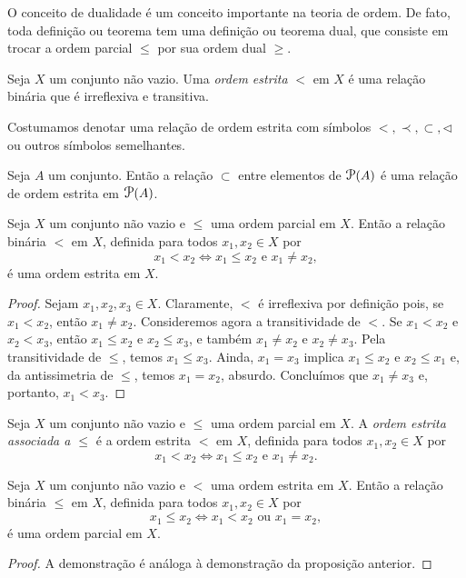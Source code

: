 	O conceito de dualidade é um conceito importante na teoria de ordem. De fato, toda definição ou teorema tem uma definição ou teorema dual, que consiste em trocar a ordem parcial $\leq$ por sua ordem dual $\geq$.

\begin{defi}
	Seja $X$ um conjunto não vazio. Uma \emph{ordem estrita} $<$ em $X$ é uma relação binária que é irreflexiva e transitiva.
\end{defi}

	Costumamos denotar uma relação de ordem estrita com símbolos $<, \prec, \subset, \lhd$ ou outros símbolos semelhantes.

\begin{ex}
	Seja $A$ um conjunto. Então a relação $\subset$ entre elementos de $\p(A)$ é uma relação de ordem estrita em $\p(A)$.
\end{ex}

\begin{prop}
	Seja $X$ um conjunto não vazio e $\leq$ uma ordem parcial em $X$. Então a relação binária $<$ em $X$, definida para todos $x_1,x_2 \in X$ por
	\begin{equation*}
	x_1 < x_2 \Leftrightarrow x_1 \leq x_2 \text{\ \ e\ \ } x_1 \neq x_2,
	\end{equation*}
é uma ordem estrita em $X$.
\end{prop}
\begin{proof}
	Sejam $x_1,x_2,x_3 \in X$. Claramente, $<$ é irreflexiva por definição pois, se $x_1 < x_2$, então $x_1 \neq x_2$. Consideremos agora a transitividade de $<$. Se $x_1 < x_2$ e $x_2 < x_3$, então $x_1 \leq x_2$ e $x_2 \leq x_3$, e também $x_1 \neq x_2$ e $x_2 \neq x_3$. Pela transitividade de $\leq$, temos $x_1 \leq x_3$. Ainda, $x_1=x_3$ implica $x_1 \leq x_2$ e $x_2 \leq x_1$ e, da antissimetria de $\leq$, temos $x_1 = x_2$, absurdo. Concluímos que $x_1 \neq x_3$ e, portanto, $x_1 < x_3$.
\end{proof}

\begin{defi}
	Seja $X$ um conjunto não vazio e $\leq$ uma ordem parcial em $X$. A \emph{ordem estrita associada a $\leq$} é a ordem estrita $<$ em $X$, definida para todos $x_1,x_2 \in X$ por
	\begin{equation*}
	x_1 < x_2 \Leftrightarrow x_1 \leq x_2 \text{\ \ e\ \ } x_1 \neq x_2.
	\end{equation*}
\end{defi}

\begin{prop}
	Seja $X$ um conjunto não vazio e $<$ uma ordem estrita em $X$. Então a relação binária $\leq$ em $X$, definida para todos $x_1,x_2 \in X$ por
	\begin{equation*}
	x_1 \leq x_2 \Leftrightarrow x_1 < x_2 \text{\ \ ou\ \ } x_1 = x_2,
	\end{equation*}
é uma ordem parcial em $X$.
\end{prop}
\begin{proof}
	A demonstração é análoga à demonstração da proposição anterior.
\end{proof}


